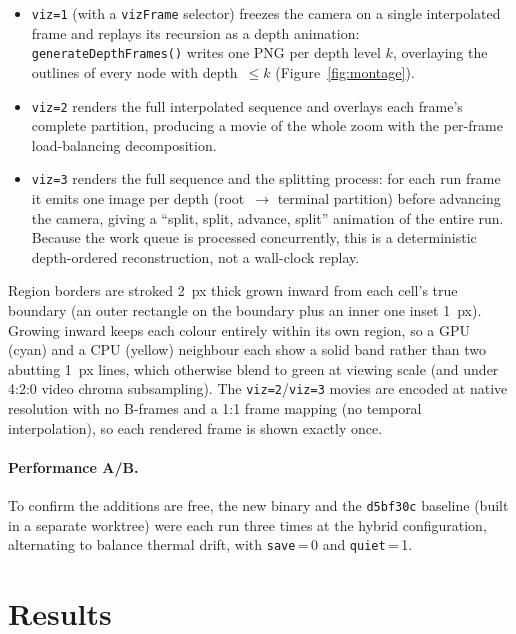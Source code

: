 \documentclass[
	english,
	letterpaper, oneside
]{article}
\begin{document}
\begin{itemize}
    \item \texttt{viz=1} (with a \texttt{vizFrame} selector) freezes the camera
    on a single interpolated frame and replays its recursion as a depth
    animation: \texttt{generateDepthFrames()} writes one PNG per depth level $k$,
    overlaying the outlines of every node with depth~$\le k$
    (Figure~\ref{fig:montage}).
    \item \texttt{viz=2} renders the full interpolated sequence and overlays
    each frame's complete partition, producing a movie of the whole zoom
    with the per-frame load-balancing decomposition.
    \item \texttt{viz=3} renders the full sequence and the splitting
    process: for each run frame it emits one image per depth (root~$\to$
    terminal partition) before advancing the camera, giving a
    ``split, split, advance, split'' animation of the entire run. Because the
    work queue is processed concurrently, this is a deterministic depth-ordered
    reconstruction, not a wall-clock replay.
\end{itemize}

\noindent Region borders are stroked 2~px thick grown inward from each
cell's true boundary (an outer rectangle on the boundary plus an inner one inset
1~px). Growing inward keeps each colour entirely within its own region, so a GPU
(cyan) and a CPU (yellow) neighbour each show a solid band rather than two
abutting 1~px lines, which otherwise blend to green at viewing scale (and under
4:2:0 video chroma subsampling). The \texttt{viz=2}/\texttt{viz=3} movies are
encoded at native resolution with no B-frames and a 1:1 frame mapping (no
temporal interpolation), so each rendered frame is shown exactly once.

\paragraph{Performance A/B.} To confirm the additions are free, the new binary
and the \texttt{d5bf30c} baseline (built in a separate worktree) were each run
three times at the hybrid configuration, alternating to balance thermal drift,
with \texttt{save}\,=\,0 and \texttt{quiet}\,=\,1.

\section{Results}
\end{document}
